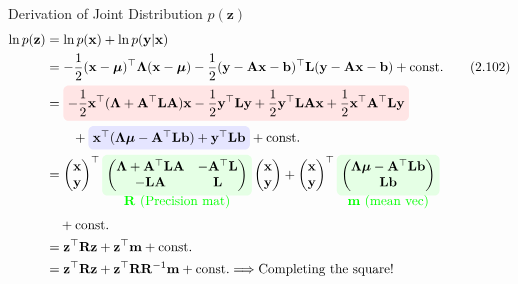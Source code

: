 \documentclass[10pt]{beamer}
\newcommand{\highlight}[2][yellow]{\tikz[baseline=(x.base)]{\node[rectangle,rounded corners,fill=#1!10](x){$#2$};}}
\newcommand{\highlightcap}[3][yellow]{\tikz[baseline=(x.base)]{\node[rectangle,rounded corners,fill=#1!10](x){$#2$} node[below of=x, node distance=2em, color=#1]{#3};}}
\begin{document}
    \begin{frame}{Derivation of Joint Distribution $p(\mathbf z)$}
        \vspace*{-5mm}
        \begin{align*}
            \ln p(\mathbf z) 
            &= \ln p(\mathbf x) + \ln p(\mathbf y | \mathbf x) \\
            &= -\frac{1}{2}(\mathbf x - \bm\mu)^\top\bm\Lambda(\mathbf x - \bm\mu) 
            -\frac{1}{2}(\mathbf y - \mathbf A\mathbf x - \mathbf b)^\top\mathbf L(\mathbf y - \mathbf A\mathbf x - \mathbf b)
                + \mathrm{const.} \tag{2.102} \\
            &= \highlight[red]{\displaystyle -\frac{1}{2}\mathbf x^\top(\bm\Lambda + \mathbf A^\top\mathbf L\mathbf A)\mathbf x
                -\frac{1}{2} \mathbf y^\top\mathbf L\mathbf y 
                +\frac{1}{2} \mathbf y^\top\mathbf L\mathbf A\mathbf x
                +\frac{1}{2} \mathbf x^\top\mathbf A^\top\mathbf L\mathbf y} \\
            &\qquad + \highlight[blue]{\mathbf x^\top(\bm\Lambda\bm\mu - \mathbf A^\top\mathbf L\mathbf b) + \mathbf y^\top\mathbf L\mathbf b} + \mathrm{const.}\\
            &= \begin{pmatrix}\mathbf x\\ \mathbf y\end{pmatrix}^\top
            \highlightcap[green]{\begin{pmatrix}
                \bm\Lambda + \mathbf A^\top\mathbf L\mathbf A & -\mathbf A^\top\mathbf L \\
                -\mathbf L\mathbf A& \mathbf L
            \end{pmatrix}}{$\mathbf R$ (Precision mat)}
            \begin{pmatrix}\mathbf x\\ \mathbf y\end{pmatrix}
            + \begin{pmatrix}\mathbf x\\ \mathbf y\end{pmatrix}^\top
                \highlightcap[green]{\begin{pmatrix}\bm\Lambda\bm\mu - \mathbf A^\top\mathbf L\mathbf b \\ \mathbf L\mathbf b\end{pmatrix}}{$\mathbf m$ (mean vec)} \\
            & \quad + \mathrm{const.} \\
            &= \mathbf z^\top\mathbf R\mathbf z + \mathbf z^\top \mathbf m + \mathrm{const.} \\
            &= \mathbf z^\top\mathbf R\mathbf z + \mathbf z^\top \mathbf R \mathbf R^{-1} \mathbf m + \mathrm{const.} \Longrightarrow \mbox{Completing the square!}
        \end{align*}
    \end{frame}
    
\end{document}
